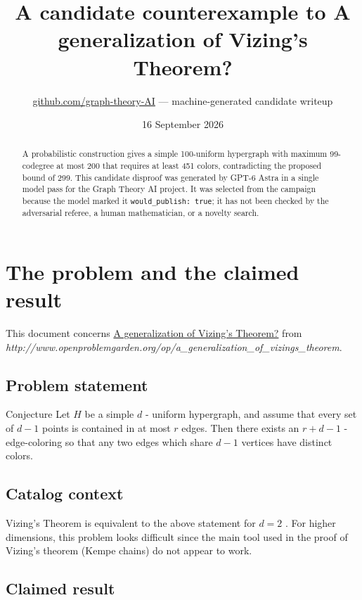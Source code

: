 \documentclass[
  11pt,
  a4paper,
]{article}
\title{A candidate counterexample to A generalization of Vizing's
Theorem?}
\author{\href{https://github.com/graph-theory-AI}{github.com/graph-theory-AI}
--- machine-generated candidate writeup}
\date{16 September 2026}
\begin{document}
\maketitle
\begin{abstract}
A probabilistic construction gives a simple 100-uniform hypergraph with
maximum 99-codegree at most 200 that requires at least 451 colors,
contradicting the proposed bound of 299. This candidate disproof was
generated by GPT-6 Astra in a single model pass for the Graph Theory AI
project. It was selected from the campaign because the model marked it
\texttt{would\_publish:\ true}; it has not been checked by the
adversarial referee, a human mathematician, or a novelty search.
\end{abstract}

\section{The problem and the claimed
result}\label{the-problem-and-the-claimed-result}

This document concerns
\href{https://graph-theory-ai.github.io/graph-conjectures/op/a_generalization_of_vizings_theorem/}{A
generalization of Vizing's Theorem?} from
\emph{http://www.openproblemgarden.org/op/a\_generalization\_of\_vizings\_theorem}.

\subsection{Problem statement}\label{problem-statement}

Conjecture Let \(H\) be a simple \(d\) - uniform hypergraph, and assume
that every set of \(d-1\) points is contained in at most \(r\) edges.
Then there exists an \(r+d-1\) -edge-coloring so that any two edges
which share \(d-1\) vertices have distinct colors.

\subsection{Catalog context}\label{catalog-context}

Vizing's Theorem is equivalent to the above statement for \(d=2\) . For
higher dimensions, this problem looks difficult since the main tool used
in the proof of Vizing's theorem (Kempe chains) do not appear to work.

\subsection{Claimed result}\label{claimed-result}
\end{document}
